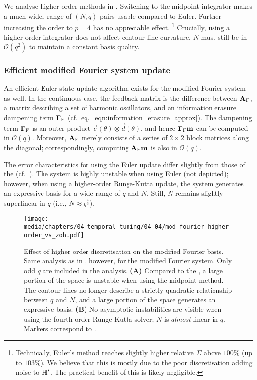 We analyse higher order methods in .
Switching to the midpoint integrator makes a much wider range of $(N, q)$-pairs usable compared to Euler.
Further increasing the order to $p = 4$ has no appreciable effect.%
\footnote{Technically, Euler's method reaches slightly higher relative $\Sigma$ above $100\%$ (up to $103\%$). 
We believe that this is mostly due to the poor discretisation adding noise to $\mathbf{H}'$.
The practical benefit of this is likely negligible.}
Crucially, using a higher-order integrator does not affect contour line curvature. $N$ must still be in $\mathcal{O}(q^2)$ to maintain a constant basis quality.

\subsubsection{Efficient modified Fourier system update}

An efficient Euler state update algorithm exists for the modified Fourier \LTI system as well.
In the continuous case, the feedback matrix is the difference between $\mathbf{A}_\mathrm{F}$, a matrix describing a set of harmonic oscillators, and an information erasure dampening term $\mathbf{\Gamma}_\mathrm{F}$ (cf.~eq.~\ref{eqn:information_erasure_approx}).
The dampening term $\mathbf{\Gamma}_\mathrm{F}$ is an outer product $\vec e(\theta) \otimes \vec d(\theta)$, and hence $\mathbf{\Gamma}_\mathrm{F} \mathbf{m}$ can be computed in $\mathcal{O}(q)$.
Moreover, $\mathbf{A}_\mathrm{F}$ merely consists of a series of $2 \times 2$ block matrices along the diagonal; correspondingly, computing $\mathbf{A}_\mathrm{F} \mathbf{m}$ is also in $\mathcal{O}(q)$.

The error characteristics for using the Euler update differ slightly from those of the \LDN (cf.~).
The system is highly unstable when using Euler (not depicted); however, when using a higher-order Runge-Kutta update, the system generates an expressive basis for a wide range of $q$ and $N$.
Still, $N$ remains slightly superlinear in $q$ (i.e., $N \approx q^{\frac{4}3}$).

\begin{figure}
	\texttt{[image: media/chapters/04\_temporal\_tuning/04\_04/mod\_fourier\_higher\_order\_vs\_zoh.pdf]}
	\caption[Effect of higher order discretisation on the modified Fourier basis]{Effect of higher order discretisation on the modified Fourier basis. Same analysis as in , however, for the modified Fourier system.
	Only odd $q$ are included in the analysis.
	\textbf{(A)} Compared to the \LDN, a large portion of the space is unstable when using the midpoint method.
	The contour lines no longer describe a strictly quadratic relationship between $q$ and $N$, and a large portion of the space generates an expressive basis.
	\textbf{(B)} No asymptotic instabilities are visible when using the fourth-order Runge-Kutta solver; $N$ is \emph{almost} linear in $q$.
	Markers correspond to .
	}
	\label{fig:mod_fourier_higher_order_vs_zoh}
\end{figure}

